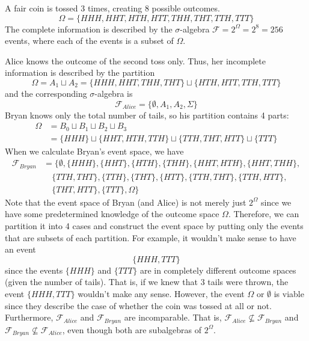   \begin{example}
    \label{ex:3-coin-tosses}
    A fair coin is tossed 3 times, creating 8 possible outcomes. 
    \begin{equation}
      \Omega = \{HHH, HHT, HTH, HTT, THH, THT, TTH, TTT\}
    \end{equation}
    The complete information is described by the $\sigma$-algebra $\mathcal{F} = 2^{\Omega} = 2^8 = 256$ events, where each of the events is a subset of $\Omega$. 

    Alice knows the outcome of the second toss only. Thus, her incomplete information is described by the partition 
    \begin{equation}
      \Omega = A_1 \sqcup A_2 = \{HHH, HHT, THH, THT\} \sqcup \{HTH, HTT, TTH, TTT\}
    \end{equation}
    and the corresponding $\sigma$-algebra is 
    \begin{equation}
    \mathcal{F}_{Alice} = \{\emptyset, A_1, A_2, \Sigma\}
    \end{equation}
    Bryan knows only the total number of tails, so his partition contains 4 parts: 
    \begin{align*}
      \Omega & = B_0 \sqcup B_1 \sqcup B_2 \sqcup B_3 \\
        & = \{HHH\} \sqcup \{HHT, HTH, TTH\} \sqcup \{TTH, THT, HTT\} \sqcup \{TTT\}
    \end{align*}
    When we calculate Bryan's event space, we have
    \begin{align*}
      \mathcal{F}_{Bryan} & = \big\{\emptyset, \{HHH\}, \{HHT\}, \{HTH\}, \{THH\}, \{HHT, HTH\}, \{HHT, THH\}, \\
      & \quad\{TTH, THT\}, \{TTH\}, \{THT\}, \{HTT\}, \{TTH, THT\},\{TTH, HTT\}, \\
      & \quad\{THT, HTT\}, \{TTT\}, \Omega \big\} 
    \end{align*}
    Note that the event space of Bryan (and Alice) is not merely just $2^{\Omega}$ since we have some predetermined knowledge of the outcome space $\Omega$. Therefore, we can partition it into 4 cases and construct the event space by putting only the events that are subsets of each partition. For example, it wouldn't make sense to have an event 
    \begin{equation}
      \{HHH, TTT\}
    \end{equation}
    since the events $\{HHH\}$ and $\{TTT\}$ are in completely different outcome spaces (given the number of tails). That is, if we knew that 3 tails were thrown, the event $\{HHH, TTT\}$ wouldn't make any sense. However, the event $\Omega$ or $\emptyset$ is viable since they describe the case of whether the coin was tossed at all or not. 
    Furthermore, $\mathcal{F}_{Alice}$ and $\mathcal{F}_{Bryan}$ are incomparable. That is, $\mathcal{F}_{Alice} \not\subseteq \mathcal{F}_{Bryan}$ and $\mathcal{F}_{Bryan} \not\subseteq \mathcal{F}_{Alice}$, even though both are subalgebras of $2^{\Omega}$. 
  \end{example}

